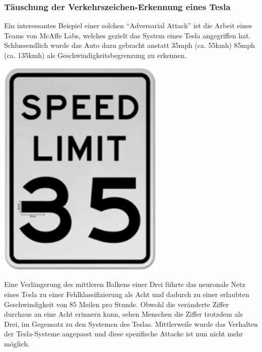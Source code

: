 \documentclass[
  12pt, %
  a4paper, %
  oneside, %
  openany, 
  numbers=noenddot, %
  BCOR=5mm, %
  parskip=half*, %
  thesis, %
]{bfhbook}
\begin{document}

\subsubsection*{Täuschung der Verkehrszeichen-Erkennung eines Tesla}
Ein interessantes Beispiel einer solchen ``Adversarial Attack'' ist die Arbeit eines Teams von McAffe Labs, welches gezielt das System eines Tesla angegriffen hat. Schlussendlich wurde das Auto dazu gebracht anstatt 35mph (ca. 55kmh)  85mph (ca. 135kmh) als Geschwindigkeitsbegrenzung zu erkennen.

\parencite{advTesla} 

\begin{center}
\begin{minipage}[t]{0.45\linewidth}
	\vspace{0pt}
	\centering
	\includegraphics[width=0.6\textwidth]{Bilder/speed-limit-fake-small.png}
\end{minipage}\hfill
\begin{minipage}[t]{0.45\linewidth}
	\vspace{0pt}
	Eine Verlängerung des mittleren Balkens einer Drei führte das neuronale Netz eines Tesla zu einer Fehlklassifizierung als Acht und dadurch zu einer erlaubten Geschwindigkeit von 85 Meilen pro Stunde. Obwohl die veränderte Ziffer durchaus an eine Acht erinnern kann, sehen Menschen die Ziffer trotzdem als Drei, im Gegensatz zu den Systemen des Teslas.
\break\break
Mittlerweile wurde das Verhalten der Tesla-Systeme angepasst und diese spezifische Attacke ist nun nicht mehr möglich.
\end{minipage}
\end{center}
\end{document}

